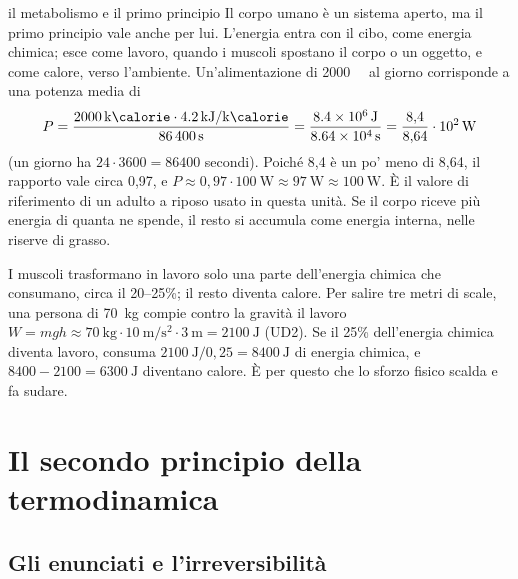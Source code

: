 \begin{applicazione}{il metabolismo e il primo principio}
Il corpo umano è un sistema aperto, ma il primo principio vale anche per lui. L'energia entra con il cibo, come energia chimica; esce come lavoro, quando i muscoli spostano il corpo o un oggetto, e come calore, verso l'ambiente. Un'alimentazione di \SI{2000}{\kilo\calorie} al giorno corrisponde a una potenza media di
\[
  P = \frac{\SI{2000}{\kilo\calorie} \cdot \SI{4,2}{\kilo\joule\per\kilo\calorie}}{\SI{86400}{\second}} = \frac{\SI{8,4e6}{\joule}}{\SI{8,64e4}{\second}} = \frac{8{,}4}{8{,}64} \cdot 10^{2}\,\si{\watt}
\]
(un giorno ha $24 \cdot 3600 = \num{86400}$ secondi). Poiché 8,4 è un po' meno di 8,64, il rapporto vale circa 0,97, e $P \approx 0{,}97 \cdot \SI{100}{\watt} \approx \SI{97}{\watt} \approx \SI{100}{\watt}$. È il valore di riferimento di un adulto a riposo usato in questa unità. Se il corpo riceve più energia di quanta ne spende, il resto si accumula come energia interna, nelle riserve di grasso.

I muscoli trasformano in lavoro solo una parte dell'energia chimica che consumano, circa il 20--25\%; il resto diventa calore. Per salire tre metri di scale, una persona di \SI{70}{\kilo\gram} compie contro la gravità il lavoro $W = mgh \approx \SI{70}{\kilo\gram} \cdot \SI{10}{\metre\per\second\squared} \cdot \SI{3}{\metre} = \SI{2100}{\joule}$ (UD2). Se il 25\% dell'energia chimica diventa lavoro, consuma $\SI{2100}{\joule} / 0{,}25 = \SI{8400}{\joule}$ di energia chimica, e $8400 - 2100 = \SI{6300}{\joule}$ diventano calore. È per questo che lo sforzo fisico scalda e fa sudare.
\end{applicazione}

\section{Il secondo principio della termodinamica}
\label{sec:ud5-secondo}

\subsection{Gli enunciati e l'irreversibilità}

